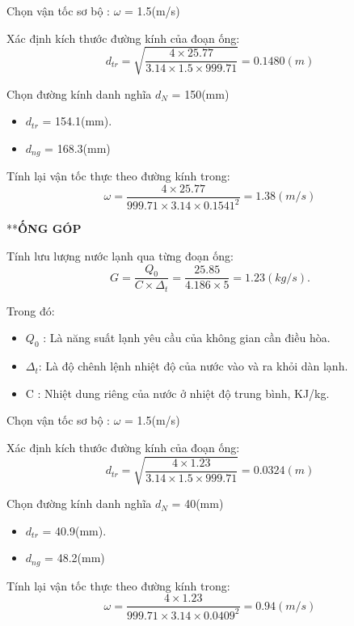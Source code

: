 Chọn vận tốc sơ bộ : $\omega$ = 1.5(m/s)

Xác định kích thước đường kính của đoạn ống:
\begin{equation*}
	d_{tr} = \sqrt{\dfrac{4 \times 25.77}{3.14 \times 1.5 \times 999.71}} = 0.1480(m)
\end{equation*}

Chọn đường kính danh nghĩa $d_{N}$ = 150(mm)
\begin{itemize}
	\item $d_{tr}$ = 154.1(mm).
	\item $d_{ng}$ = 168.3(mm)
\end{itemize}

Tính lại vận tốc thực theo đường kính trong:
\begin{equation*}
	\omega = \dfrac{4 \times 25.77 }{999.71 \times 3.14 \times 0.1541^{2}} = 1.38(m/s)
\end{equation*}

**\textbf{ỐNG GÓP}

Tính lưu lượng nước lạnh qua từng đoạn ống:
\begin{equation*}
	G = \dfrac{Q_{0}}{C \times \Delta_{t}} =\dfrac{25.85}{4.186 \times 5} = 1.23(kg/s).
\end{equation*}

Trong đó:
\begin{itemize}
	\item $Q_{0}$ : Là năng suất lạnh yêu cầu của không gian cần điều hòa.
	\item $\Delta_{t}$: Là độ chênh lệnh nhiệt độ của nước vào và ra khỏi dàn lạnh.
	\item C : Nhiệt dung riêng của nước ở nhiệt độ trung bình, KJ/kg.
\end{itemize}

Chọn vận tốc sơ bộ : $\omega$ = 1.5(m/s)

Xác định kích thước đường kính của đoạn ống:
\begin{equation*}
	d_{tr} = \sqrt{\dfrac{4 \times 1.23}{3.14 \times 1.5 \times 999.71}} =0.0324 (m)
\end{equation*}

Chọn đường kính danh nghĩa $d_{N}$ = 40(mm)
\begin{itemize}
	\item $d_{tr}$ = 40.9(mm).
	\item $d_{ng}$ = 48.2(mm)
\end{itemize}

Tính lại vận tốc thực theo đường kính trong:
\begin{equation*}
	\omega = \dfrac{4 \times 1.23 }{999.71 \times 3.14 \times 0.0409^{2}} = 0.94(m/s)
\end{equation*}


